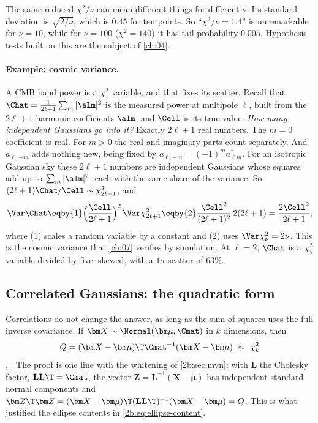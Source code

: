 The same reduced $\chi^2/\nu$ can mean different things for different $\nu$. Its standard deviation is $\sqrt{2/\nu}$, which is $0.45$ for ten points. So ``$\chi^2/\nu=1.4$'' is unremarkable for $\nu=10$, while for $\nu=100$ ($\chi^2=140$) it has tail probability $0.005$. Hypothesis tests built on this are the subject of \cref{ch:04}.

\paragraph{Example: cosmic variance.} A CMB band power is a $\chi^2$ variable, and that fixes its scatter. Recall that $\Chat=\frac{1}{2\ell+1}\sum_m|\alm|^2$ is the measured power at multipole $\ell$, built from the $2\ell+1$ harmonic coefficients $\alm$, and $\Cell$ is its true value. \emph{How many independent Gaussians go into it?} Exactly $2\ell+1$ real numbers. The $m=0$ coefficient is real. For $m>0$ the real and imaginary parts count separately. And $a_{\ell,-m}$ adds nothing new, being fixed by $a_{\ell,-m}=(-1)^ma^*_{\ell m}$. For an isotropic Gaussian sky these $2\ell+1$ numbers are independent Gaussians whose squares add up to $\sum_m|\alm|^2$, each with the same share of the variance. So $(2\ell+1)\Chat/\Cell\sim\chi^2_{2\ell+1}$, and
\[
  \Var\Chat\eqby{1}\Bigl(\frac{\Cell}{2\ell+1}\Bigr)^2\,\Var\chi^2_{2\ell+1}\eqby{2}\frac{\Cell^2}{(2\ell+1)^2}\,2(2\ell+1)=\frac{2\Cell^2}{2\ell+1},
\]
where (1) scales a random variable by a constant and (2) uses $\Var\chi^2_\nu=2\nu$. This is the cosmic variance that \cref{ch:07} verifies by simulation. At $\ell=2$, $\Chat$ is a $\chi^2_5$ variable divided by five: skewed, with a $1\sigma$ scatter of $63\%$.

\subsection{Correlated Gaussians: the quadratic form}
\label{2b:sec:chi2-quadform}

Correlations do not change the answer, as long as the sum of squares uses the full inverse covariance. If $\bm X\sim\Normal(\bm\mu,\Cmat)$ in $k$ dimensions, then
\begin{equation}
  Q=(\bm X-\bm\mu)\T\Cmat^{-1}(\bm X-\bm\mu)\ \sim\ \chi^2_k
  \label{2b:eq:quadform}
\end{equation}
, . The proof is one line with the whitening of \cref{2b:sec:mvn}: with $\mathbf L$ the Cholesky factor, $\mathbf L\mathbf L\T=\Cmat$, the vector $\bm Z=\mathbf L^{-1}(\bm X-\bm\mu)$ has independent standard normal components and $\bm Z\T\bm Z=(\bm X-\bm\mu)\T(\mathbf L\mathbf L\T)^{-1}(\bm X-\bm\mu)=Q$. This is what justified the ellipse contents in \eqref{2b:eq:ellipse-content}.

